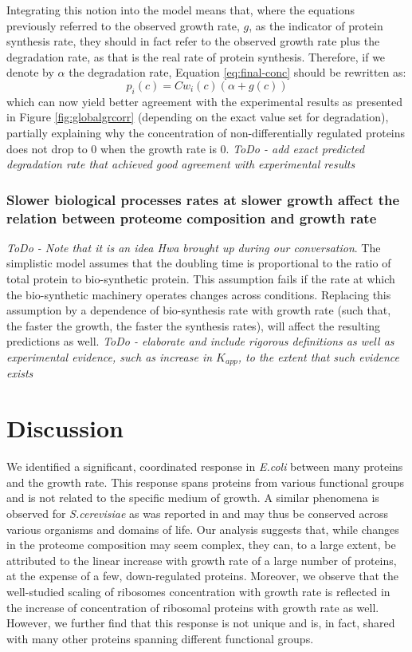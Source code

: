\documentclass[notitlepage]{article}
\begin{document}
Integrating this notion into the model means that, where the equations previously referred to the observed growth rate, $g$, as the indicator of protein synthesis rate, they should in fact refer to the observed growth rate plus the degradation rate, as that is the real rate of protein synthesis.
Therefore, if we denote by $\alpha$ the degradation rate, Equation \ref{eq:final-conc} should be rewritten as:
\begin{equation}
  \label{eq:final-conc-deg}
  p_i(c)=Cw_i(c)(\alpha+g(c))
\end{equation}
which can now yield better agreement with the experimental results as presented in Figure \ref{fig:globalgrcorr} (depending on the exact value set for degradation), partially explaining why the concentration of non-differentially regulated proteins does not drop to 0 when the growth rate is 0.
\emph{ToDo - add exact predicted degradation rate that achieved good agreement with experimental results}

\subsubsection{Slower biological processes rates at slower growth affect the relation between proteome composition and growth rate}
\emph{ToDo - Note that it is an idea Hwa brought up during our conversation}.
The simplistic model assumes that the doubling time is proportional to the ratio of total protein to bio-synthetic protein.
This assumption fails if the rate at which the bio-synthetic machinery operates changes across conditions.
Replacing this assumption by a dependence of bio-synthesis rate with growth rate (such that, the faster the growth, the faster the synthesis rates), will affect the resulting predictions as well.
\emph{ToDo - elaborate and include rigorous definitions as well as experimental evidence, such as increase in $K_{app}$, to the extent that such evidence exists}

\section{Discussion}
We identified a significant, coordinated response in \emph{E.coli} between many proteins and the growth rate.
This response spans proteins from various functional groups and is not related to the specific medium of growth.
A similar phenomena is observed for \emph{S.cerevisiae} as was reported in \parencite{Keren2013a} and may thus be conserved across various organisms and domains of life.
Our analysis suggests that, while changes in the proteome composition may seem complex, they can, to a large extent, be attributed to the linear increase with growth rate of a large number of proteins, at the expense of a few, down-regulated proteins.
Moreover, we observe that the well-studied scaling of ribosomes concentration with growth rate is reflected in the increase of concentration of ribosomal proteins with growth rate as well.
However, we further find that this response is not unique and is, in fact, shared with many other proteins spanning different functional groups.
\end{document}
